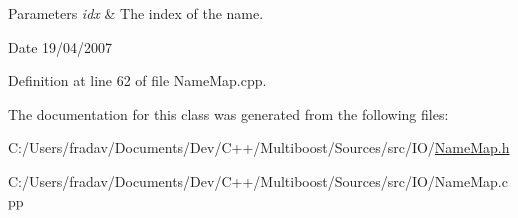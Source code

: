 \begin{DoxyParams}{Parameters}
{\em idx} & The index of the name. \\
\hline
\end{DoxyParams}
\begin{DoxyDate}{Date}
19/04/2007 
\end{DoxyDate}


Definition at line 62 of file Name\-Map.\-cpp.



The documentation for this class was generated from the following files\-:\begin{DoxyCompactItemize}
\item 
C\-:/\-Users/fradav/\-Documents/\-Dev/\-C++/\-Multiboost/\-Sources/src/\-I\-O/\hyperlink{NameMap_8h}{Name\-Map.\-h}\item 
C\-:/\-Users/fradav/\-Documents/\-Dev/\-C++/\-Multiboost/\-Sources/src/\-I\-O/Name\-Map.\-cpp\end{DoxyCompactItemize}
